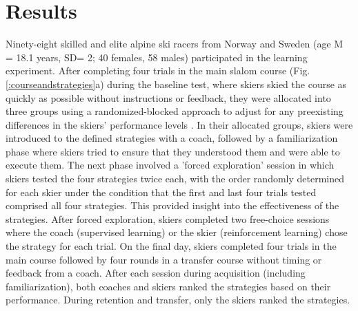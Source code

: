 \documentclass{article}
\begin{document}
\section{Results}
Ninety-eight skilled and elite alpine ski racers from Norway and Sweden (age M = 18.1 years, SD= 2; 40 females, 58 males) participated in the learning experiment. After completing four trials in the main slalom course (Fig. \ref{:courseandstrategies}a) during the baseline test, where skiers skied the course as quickly as possible without instructions or feedback, they were allocated into three groups using a randomized-blocked approach to adjust for any preexisting differences in the skiers' performance levels \cite{maxwell_designing_2017}. In their allocated groups, skiers were introduced to the defined strategies with a coach, followed by a familiarization phase where skiers tried to ensure that they understood them and were able to execute them. The next phase involved a 'forced exploration' session in which skiers tested the four strategies twice each, with the order randomly determined for each skier under the condition that the first and last four trials tested comprised all four strategies. This provided insight into the effectiveness of the strategies. After forced exploration, skiers completed two free-choice sessions where the coach (supervised learning) or the skier (reinforcement learning) chose the strategy for each trial. On the final day, skiers completed four trials in the main course followed by four rounds in a transfer course without timing or feedback from a coach. After each session during acquisition (including familiarization), both coaches and skiers ranked the strategies based on their performance. During retention and transfer, only the skiers ranked the strategies.
\end{document}
